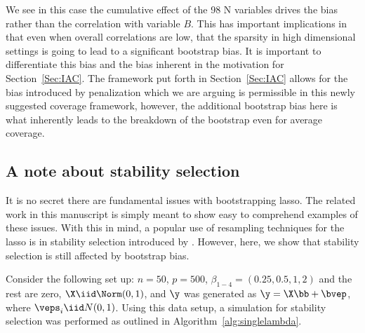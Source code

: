 We see in this case the cumulative effect of the 98 N variables drives the bias rather than the correlation with variable $B$. This has important implications in that even when overall correlations are low, that the sparsity in high dimensional settings is going to lead to a significant bootstrap bias. It is important to differentiate this bias and the bias inherent in the motivation for Section~\ref{Sec:IAC}. The framework put forth in Section~\ref{Sec:IAC} allows for the bias introduced by penalization which we are arguing is permissible in this newly suggested coverage framework, however, the additional bootstrap bias here is what inherently leads to the breakdown of the bootstrap even for average coverage.

\clearpage
\subsection{A note about stability selection}
\label{sup:stability}

It is no secret there are fundamental issues with bootstrapping lasso. The related work in this manuscript is simply meant to show easy to comprehend examples of these issues. With this in mind, a popular use of resampling techniques for the lasso is in stability selection introduced by  \cite{Meinshausen2010}. However, here, we show that stability selection is still affected by bootstrap bias.

Consider the following set up: $n = 50$, $p = 500$, $\beta_{1-4} = (0.25, 0.5, 1, 2)$ and the rest are zero, $\X \iid \Norm(0, 1)$, and $\y$ was generated as $\y = \X\bb + \bvep$, where $\veps_i \iid N(0, 1)$. Using this data setup, a simulation for stability selection was performed as outlined in Algorithm~\ref{alg:singlelambda}.

